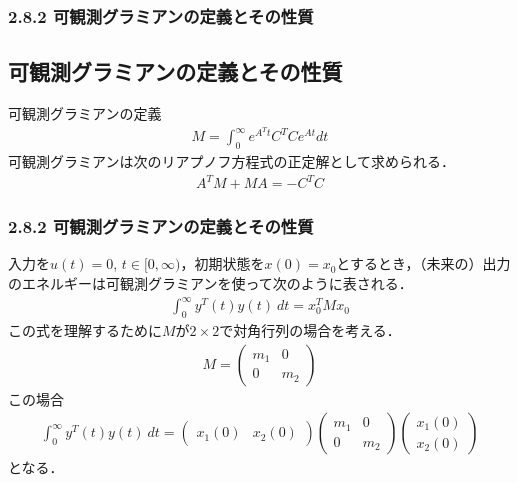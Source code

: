 \begin{frame}[t]
\frametitle{2.8.2 可観測グラミアンの定義とその性質}

\subsection{可観測グラミアンの定義とその性質}

\noindent
可観測グラミアンの定義
\begin{align}
	M = \int_{0}^{\infty} e^{A^T t} C^T C e^{At} dt
\end{align}
可観測グラミアンは次のリアプノフ方程式の正定解として求められる．
\begin{align}
	A^T M + M A = - C^T C
\end{align}
\end{frame}

\begin{frame}[t]
\frametitle{2.8.2 可観測グラミアンの定義とその性質}
入力を$u(t)=0$, $t \in [0, \infty)$，初期状態を$x(0)=x_0$とするとき，（未来の）出力のエネルギーは可観測グラミアンを使って次のように表される．
\begin{align}
	\int_{0}^{\infty} y^T(t) y(t) \ dt = x_0^T M x_0
\end{align}
この式を理解するために$M$が$2 \times 2$で対角行列の場合を考える．
\begin{align}
	M = 
	\left(\begin{array}{cc}
         m_1 & 0 \\
	 0   & m_2 
	\end{array}\right)
\end{align}
この場合
\begin{align}
	\int_{0}^{\infty} y^T(t) y(t) \ dt 
	=
	\left(\begin{array}{cc}
         x_1(0) & x_2(0) 
	\end{array}\right)
	\left(\begin{array}{cc}
         m_1 & 0 \\
	 0   & m_2 
	\end{array}\right)
	\left(\begin{array}{c}
         x_1(0)\\
	 x_2(0) 
	\end{array}\right)
\end{align}
となる．
\end{frame}

